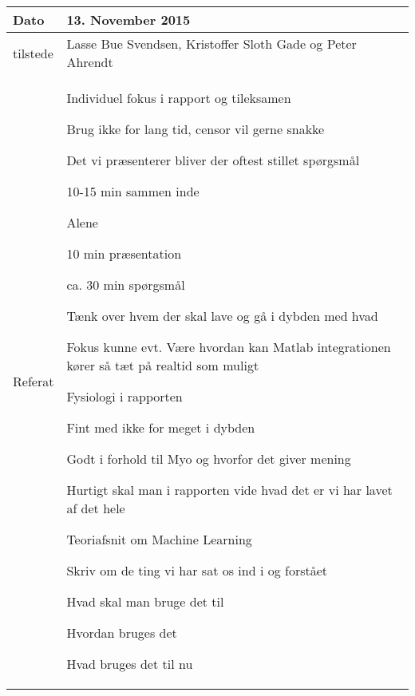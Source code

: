 \begin{center}
	\begin{tabular}{| l | p{10cm} |}
		\hline
		Dato		& 13. November 2015\\ \hline
		tilstede 	& Lasse Bue Svendsen, Kristoffer Sloth Gade og Peter Ahrendt\\ \hline
		Referat		& \vspace{-5mm}\begin{myEnumerate}
			\item Individuel fokus i rapport og tileksamen
			\begin{myItemize}				
				\item Brug ikke for lang tid, censor vil gerne snakke
				\item Det vi præsenterer bliver der oftest stillet spørgsmål
				\item 10-15 min sammen inde
				\item Alene
				\begin{myItemize}
					\item 10 min præsentation
					\item ca. 30 min spørgsmål
				\end{myItemize}
				\item Tænk over hvem der skal lave og gå i dybden med hvad
				\item Fokus kunne evt. Være hvordan kan Matlab integrationen kører så tæt på realtid som muligt
			\end{myItemize}
			\item Fysiologi i rapporten
			\begin{myItemize}
				\item Fint med ikke for meget i dybden
				\item Godt i forhold til Myo og hvorfor det giver mening
				\item Hurtigt skal man i rapporten vide hvad det er vi har lavet af det hele
			\end{myItemize}
			\item Teoriafsnit om Machine Learning
			\begin{myItemize}
				\item Skriv om de ting vi har sat os ind i og forstået
				\begin{myItemize}
					\item Hvad skal man bruge det til
					\item Hvordan bruges det
					\item Hvad bruges det til nu
				\end{myItemize}
			\end{myItemize}
		\end{myEnumerate}\\ 	
		\hline
	\end{tabular}
\end{center}

